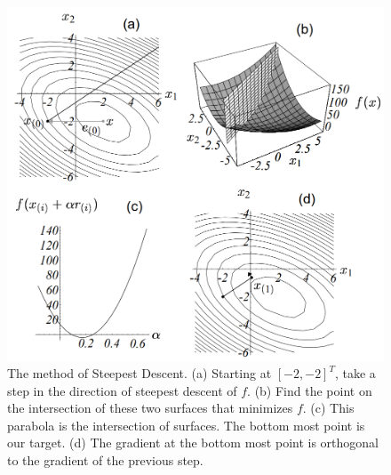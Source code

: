 \documentclass{article}
\begin{document}
\begin{figure}[H]
   \centering
   \includegraphics[scale=0.4]{steepest_descent.png}
   \caption{The method of Steepest Descent. (a) Starting at $[-2,-2]^T$, take a step in the direction of steepest descent of $f$. (b) Find the point on the intersection of these two surfaces that minimizes $f$. (c) This parabola is the intersection of surfaces. The bottom most point is our target. (d) The gradient at the bottom most point is orthogonal to the gradient of the previous step.}
   \label{fig:steepest}
\end{figure}
\end{document}
